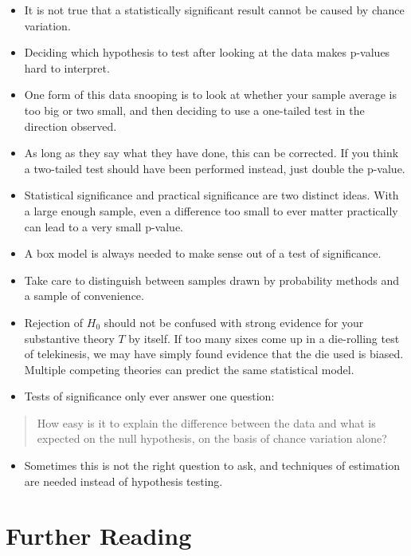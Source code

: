 \documentclass[
]{book}
\providecommand{\tightlist}{%
  \setlength{\itemsep}{0pt}\setlength{\parskip}{0pt}}
\begin{document}
\begin{itemize}
\tightlist
\item
  It is not true that a statistically significant result cannot be caused by chance variation.
\item
  Deciding which hypothesis to test after looking at the data makes p-values hard to interpret.
\item
  One form of this data snooping is to look at whether your sample average is too big or two small, and then deciding to use a one-tailed test in the direction observed.
\item
  As long as they say what they have done, this can be corrected. If you think a two-tailed test should have been performed instead, just double the p-value.
\item
  Statistical significance and practical significance are two distinct ideas. With a large enough sample, even a difference too small to ever matter practically can lead to a very small p-value.
\item
  A box model is always needed to make sense out of a test of significance.
\item
  Take care to distinguish between samples drawn by probability methods and a sample of convenience.
\item
  Rejection of \(H_0\) should not be confused with strong evidence for your substantive theory \(T\) by itself. If too many sixes come up in a die-rolling test of telekinesis, we may have simply found evidence that the die used is biased. Multiple competing theories can predict the same statistical model.
\item
  Tests of significance only ever answer one question:
\end{itemize}

\begin{quote}
How easy is it to explain the difference between the data and what is expected on the null hypothesis, on the basis of chance variation alone?
\end{quote}

\begin{itemize}
\tightlist
\item
  Sometimes this is not the right question to ask, and techniques of estimation are needed instead of hypothesis testing.
\end{itemize}

\hypertarget{further-reading-12}{%
\chapter*{Further Reading}\label{further-reading-12}}

  
\end{document}
